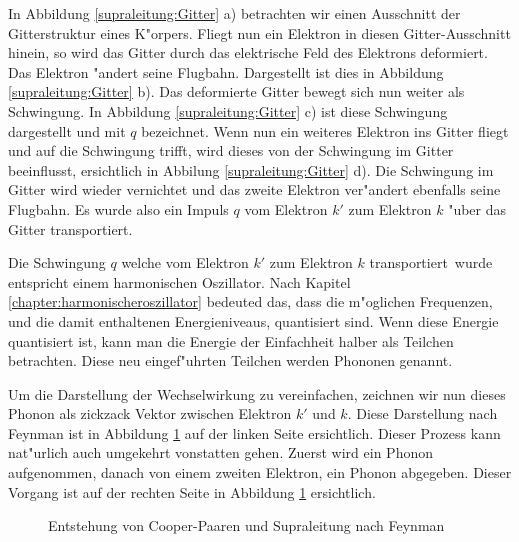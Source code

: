 \begin{refsection}
In Abbildung \ref{supraleitung:Gitter} a) betrachten wir einen Ausschnitt der Gitterstruktur eines K"orpers.
Fliegt nun ein Elektron in diesen Gitter-Ausschnitt hinein, so wird das Gitter durch das
elektrische Feld des Elektrons deformiert.
Das Elektron "andert seine Flugbahn.
Dargestellt ist dies in Abbildung \ref{supraleitung:Gitter} b).
Das deformierte Gitter bewegt sich nun weiter als Schwingung.
In Abbildung \ref{supraleitung:Gitter} c) ist diese Schwingung dargestellt und mit $q$ bezeichnet.
Wenn nun ein weiteres Elektron ins Gitter fliegt und auf die Schwingung trifft,
wird dieses von der Schwingung im Gitter beeinflusst, ersichtlich in Abbilung \ref{supraleitung:Gitter} d).
Die Schwingung im Gitter wird wieder vernichtet und das zweite Elektron ver"andert
ebenfalls seine Flugbahn.
Es wurde also ein Impuls $q$ vom Elektron $k'$ zum Elektron $k$ "uber das Gitter transportiert. 

Die Schwingung $q$ welche vom Elektron $k'$ zum Elektron $k$ \glqq transportiert\grqq~wurde
entspricht einem harmonischen Oszillator.
Nach Kapitel \ref{chapter:harmonischeroszillator} bedeuted das, dass die m"oglichen Frequenzen,
und die damit enthaltenen Energieniveaus, quantisiert sind.
Wenn diese Energie quantisiert ist, kann man die Energie der Einfachheit halber als Teilchen betrachten.
Diese neu eingef"uhrten Teilchen werden Phononen genannt.

Um die Darstellung der Wechselwirkung zu vereinfachen, zeichnen wir nun dieses Phonon
als zickzack Vektor zwischen Elektron $k'$ und $k$. Diese Darstellung nach Feynman
ist in Abbildung \ref{supraleitung:FeynmanDiagram1} auf der linken Seite ersichtlich.
Dieser Prozess kann nat"urlich auch umgekehrt vonstatten gehen.
Zuerst wird ein Phonon aufgenommen, danach von einem zweiten Elektron, ein Phonon abgegeben.
Dieser Vorgang ist auf der rechten Seite in Abbildung \ref{supraleitung:FeynmanDiagram1} ersichtlich.

\begin{figure} %
\centering

\caption{Entstehung von Cooper-Paaren und Supraleitung nach Feynman \cite{supraleitung:feynman}
\label{supraleitung:FeynmanDiagram1}}
\end{figure}


\end{refsection}
